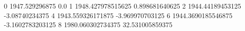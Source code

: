 0 1947.529296875 0.0
1 1948.427978515625 0.898681640625
2 1944.44189453125 -3.08740234375
4 1943.559326171875 -3.969970703125
6 1944.3690185546875 -3.1602783203125
8 1980.060302734375 32.531005859375
